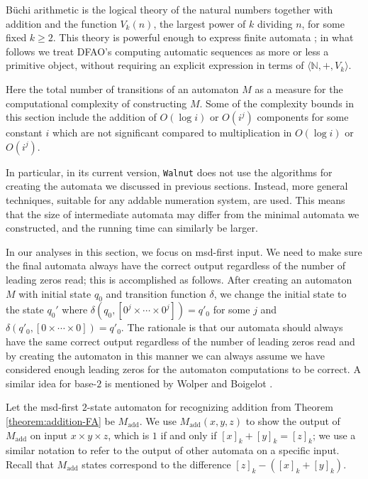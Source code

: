 \documentclass[12pt,reqno]{article}
\def\Enn{\mathbb{N}}
\def\add{\text{add}}
\begin{document}
B\"uchi arithmetic is the logical theory of the natural numbers together with addition and  the function $V_k(n)$, the largest power of $k$ dividing $n$, for some fixed $k \geq 2$.  This theory is powerful enough to express finite automata \cite{bruyere_logic_1994}; in what follows we treat DFAO's computing automatic sequences as more or less a primitive object, without requiring an explicit expression in terms of
$\langle \Enn, +, V_k \rangle$.

Here the total number of transitions of an automaton $M$ as a measure for the computational complexity of constructing $M$. Some of the complexity bounds in this section include the addition of $O(\log i)$ or $O(i^j)$ components for some constant $i$ which are not significant compared to multiplication in $O(\log i)$ or $O(i^j)$.

In particular, in its current version, {\tt Walnut} does not use the algorithms for creating the automata we discussed in previous sections.  Instead, more general techniques, suitable for any addable numeration system, are used.  This means that the size of intermediate automata may differ from the minimal automata we constructed, and the running time can similarly be larger.

In our analyses in this section, we focus on msd-first input. We need to make sure the final automata always have the correct output regardless of the number of leading zeros read; this is accomplished as follows. After creating an automaton $M$ with initial state $q_0$ and transition function $\delta$, we change the initial state to the state $q_0'$ where $\delta(q_0, [0^j \times \cdots \times 0^j])=q'_0$ for some $j$ and $\delta(q'_0, [0 \times \cdots \times 0])=q'_0$. The rationale is that our automata should always have the same correct output regardless of the number of leading zeros read and by creating the automaton in this manner we can always assume we have considered enough leading zeros for the automaton computations to be correct. A similar idea for base-$2$ is mentioned by Wolper and Boigelot \cite{wolper_construction_2000}.

Let the msd-first $2$-state automaton for recognizing addition from Theorem \ref{theorem:addition-FA} be $M_{\add}$. We use $M_{\add}(x, y, z)$ to show the output of $M_{\add}$ on input $x \times y \times z$, which is $1$ if and only if $[x]_k + [y]_k = [z]_k$; we use a similar notation to refer to the output of other automata on a specific input. Recall that $M_{\add}$ states correspond to the difference $[z]_k - ([x]_k +[y]_k)$.
\end{document}
